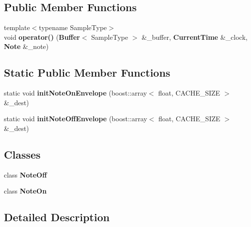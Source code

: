 \subsection*{Public Member Functions}
\begin{CompactItemize}
\item 
{\footnotesize template$<$typename SampleType$>$ }\\void \textbf{operator()} ({\bf Buffer}$<$ SampleType $>$ \&\_\-buffer, {\bf CurrentTime} \&\_\-clock, {\bf Note} \&\_\-note)\label{classharps_1_1compornent_1_1Envelope2_3_01__clock__select_00_01__delay_00_01__attack_00_01__atta211bf396f5638f048319b2d4e63e7d8c_410b50ff864375740f3b19cbcc12e624}

\end{CompactItemize}
\subsection*{Static Public Member Functions}
\begin{CompactItemize}
\item 
static void \textbf{initNoteOnEnvelope} (boost::array$<$ float, CACHE\_\-SIZE $>$ \&\_\-dest)\label{classharps_1_1compornent_1_1Envelope2_3_01__clock__select_00_01__delay_00_01__attack_00_01__atta211bf396f5638f048319b2d4e63e7d8c_2ea5c57e470eef5a9e9f2a56c905d51a}

\item 
static void \textbf{initNoteOffEnvelope} (boost::array$<$ float, CACHE\_\-SIZE $>$ \&\_\-dest)\label{classharps_1_1compornent_1_1Envelope2_3_01__clock__select_00_01__delay_00_01__attack_00_01__atta211bf396f5638f048319b2d4e63e7d8c_f828999e08175f44767a7a907f1c6e9e}

\end{CompactItemize}
\subsection*{Classes}
\begin{CompactItemize}
\item 
class \textbf{NoteOff}
\item 
class \textbf{NoteOn}
\end{CompactItemize}


\subsection{Detailed Description}
